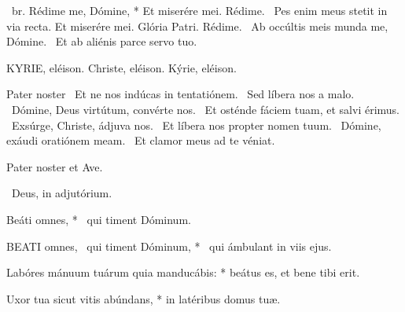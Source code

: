 \R\ br. Rédime me, Dómine, * Et miserére mei. Rédime. \V\ Pes enim meus stetit in via recta. Et miserére mei. Glória Patri. Rédime. \V\ Ab occúltis meis munda me, Dómine. \R\ Et ab aliénis parce servo tuo.



KYRIE, eléison. Christe, eléison. Kýrie, eléison.

Pater noster  \V\ Et ne nos indúcas in tentatiónem. \R\ Sed líbera nos a malo. \V\ Dómine, Deus virtútum, convérte nos. \R\ Et osténde fáciem tuam, et salvi érimus. \V\ Exsúrge, Christe, ádjuva nos. \R\ Et líbera nos propter nomen tuum. \V\ Dómine, exáudi oratiónem meam. \R\ Et clamor meus ad te véniat.



Pater noster et Ave.

\V\ Deus, in adjutórium.

 Beáti omnes, * \textdagger\ qui timent Dóminum. \textdaggerdbl


\lettrine[lines=2]{B}{EATI} omnes, \textdagger\ qui timent Dóminum, * \textdaggerdbl\ qui ámbulant in viis ejus.

Labóres mánuum tuárum quia manducábis: * beátus es, et bene tibi erit.

Uxor tua sicut vitis abúndans, * in latéribus domus tuæ.


